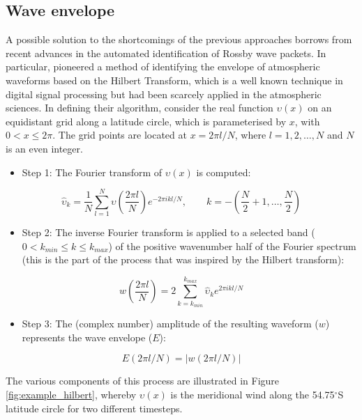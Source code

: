 \subsection{Wave envelope}

A possible solution to the shortcomings of the previous approaches borrows from recent advances in the automated identification of Rossby wave packets. In particular, \citet{Zimin2003} pioneered a method of identifying the envelope of atmospheric waveforms based on the Hilbert Transform, which is a well known technique in digital signal processing but had been scarcely applied in the atmospheric sciences. In defining their algorithm, \citet{Zimin2003} consider the real function $\upsilon(x)$ on an equidistant grid along a latitude circle, which is parameterised by $x$, with $0 < x \leq 2\pi$. The grid points are located at $x = 2 \pi l / N$, where $l = 1, 2, \dotsc, N$ and $N$ is an even integer.
\begin{itemize}
\item Step 1: The Fourier transform of $\upsilon(x)$ is computed:
\end{itemize}

\begin{equation}\label{eq:fourier_transform}
\hat{\upsilon}_k = \frac{1}{N}\sum_{l=1}^N \upsilon \left( \frac{2 \pi l}{N} \right) e^{-2 \pi ikl/N},\qquad k = -\left( \frac{N}{2} + 1, \dotsc, \frac{N}{2} \right)
\end{equation}

\begin{itemize}
\item Step 2: The inverse Fourier transform is applied to a selected band ($0 < k_{min} \leq k \leq k_{max}$) of the positive wavenumber half of the Fourier spectrum (this is the part of the process that was inspired by the Hilbert transform):
\end{itemize}

\begin{equation}\label{eq:inverse_transform}
w \left( \frac{2 \pi l}{N} \right) = 2 \sum_{k=k_{min}}^{k_{max}} \hat{\upsilon}_k e^{2\pi ikl/N}
\end{equation}

\begin{itemize}
\item Step 3: The (complex number) amplitude of the resulting waveform ($w$) represents the wave envelope ($E$):
\end{itemize}

\begin{equation}\label{eq:wave_envelope}
E(2 \pi l / N) = | w(2 \pi l / N) |
\end{equation}

The various components of this process are illustrated in Figure \ref{fig:example_hilbert}, whereby $\upsilon(x)$ is the meridional wind along the 54.75$^{\circ}$S latitude circle for two different timesteps. 
